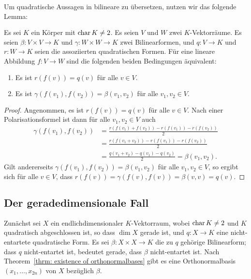 \documentclass[a4paper,10pt,numbers=noenddot]{scrartcl}
\begin{document}
Um quadratische Aussagen in bilineare zu übersetzen, nutzen wir das folgende Lemma:


\begin{lemma}\label{lem: homomorphism of quadratic and bilinear spaces}
  Es sei $K$ ein Körper mit $\operatorname{char} K \neq 2$.
  Es seien $V$ und $W$ zwei $K$-Vektorräume.
  Es seien $\beta \colon V \times V \to K$ und $\gamma \colon W \times W \to K$ zwei Bilinearformen, und $q \colon V \to K$ und $r \colon W \to K$ seien die assoziierten quadratischen Formen.
  Für eine lineare Abbildung $f \colon V \to W$ sind die folgenden beiden Bedingungen äquivalent:
  \begin{enumerate}
    \item
      Es ist $r(f(v)) = q(v)$ für alle $v \in V$.
    \item
      Es ist $\gamma(f(v_1),f(v_2)) = \beta(v_1, v_2)$ für alle $v_1, v_2 \in V$.
  \end{enumerate}
\end{lemma}
\begin{proof}
  Angenommen, es ist $r(f(v)) = q(v)$ für alle $v \in V$.
  Nach einer Polarisationsformel ist dann für alle $v_1, v_2 \in V$ auch
  \begin{align*}
        \gamma(f(v_1), f(v_2))
    &=  \frac{r(f(v_1) + f(v_2)) - r(f(v_1)) - r(f(v_2))}{2}  \\
    &=  \frac{r(f(v_1 + v_2)) - r(f(v_1)) - r(f(v_2))}{2}     \\
    &=  \frac{q(v_1 + v_2) - q(v_1) - q(v_2)}{2}
    =   \beta(v_1, v_2).
  \end{align*}
  Gilt andererseits $\gamma(f(v_1), f(v_2)) = \beta(v_1, v_2)$ für alle $v_1, v_2 \in V$, so ergibt sich für alle $v \in V$, dass
  $ r(f(v)) = \gamma(f(v), f(v)) = \beta(v, v) = q(v)$.
\end{proof}





\subsection{Der geradedimensionale Fall}


Zunächst sei $X$ ein endlichdimensionaler $K$-Vektorraum, wobei $\operatorname{char} K \neq 2$ und $K$ quadratisch abgeschlossen ist, so dass $\dim X$ gerade ist, und $q \colon X \to K$ eine nicht-entartete quadratische Form.
Es sei $\beta \colon X \times X \to K$ die zu $q$ gehörige Bilinearform; dass $q$ nicht-entartet ist, bedeutet gerade, dass $\beta$ nicht-entartet ist.
Nach Theorem~\ref{thrm: existence of orthonormalbases} gibt es eine Orthonormalbasis $(x_1, \dotsc, x_{2n})$ von $X$ bezüglich $\beta$.
\end{document}
